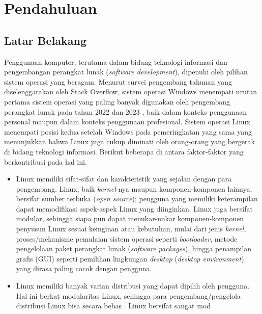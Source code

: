 \chapter{Pendahuluan}

\section{Latar Belakang}

Penggunaan komputer, terutama dalam bidang teknologi informasi dan pengembangan perangkat lunak (\textit{software development}), dipenuhi oleh pilihan sistem operasi yang beragam. Menurut survei pengembang tahunan yang diselenggarakan oleh Stack Overflow, sistem operasi Windows menempati urutan pertama sistem operasi yang paling banyak digunakan oleh pengembang perangkat lunak pada tahun 2022 \cite{stackoverflow-developer-survey-2022-most-popular-os} dan 2023 \cite{stackoverflow-developer-survey-2023-most-popular-os}, baik dalam konteks penggunaan personal maupun dalam konteks penggunaan profesional. Sistem operasi Linux menempati posisi kedua setelah Windows pada pemeringkatan yang sama yang menunjukkan bahwa Linux juga cukup diminati oleh orang-orang yang bergerak di bidang teknologi informasi. Berikut beberapa di antara faktor-faktor yang berkontribusi pada hal ini.
\begin{itemize}[leftmargin=1.5cm] %
    \item Linux memiliki sifat-sifat dan karakteristik yang sejalan dengan para pengembang. Linux, baik \textit{kernel}-nya maupun komponen-komponen lainnya, bersifat sumber terbuka (\textit{open source}); pengguna yang memiliki keterampilan dapat memodifikasi aspek-aspek Linux yang diinginkan. Linux juga bersifat modular, sehingga siapa pun dapat menukar-nukar komponen-komponen penyusun Linux sesuai keinginan atau kebutuhan, mulai dari jenis \textit{kernel}, proses/mekanisme pemulaian sistem operasi seperti \textit{bootloader}, metode pengelolaan paket perangkat lunak (\textit{software packages}), hingga penampilan grafis (GUI) seperti pemilihan lingkungan \textit{desktop} (\textit{desktop environment}) yang dirasa paling cocok dengan pengguna.

    \item Linux memiliki banyak varian distribusi yang dapat dipilih oleh pengguna. Hal ini berkat modularitas Linux, sehingga para pengembang/pengelola distribusi Linux bisa secara bebas . Linux bersifat sangat mod
\end{itemize}

